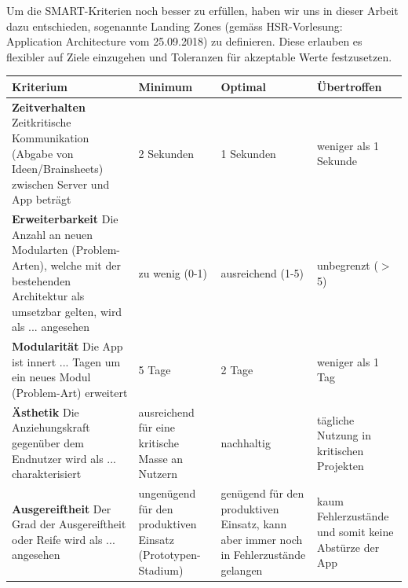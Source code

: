 Um die SMART-Kriterien noch besser zu erfüllen, haben wir uns in dieser Arbeit dazu entschieden, sogenannte Landing Zones (gemäss HSR-Vorlesung: Application Architecture vom 25.09.2018) zu definieren. Diese erlauben es flexibler auf Ziele einzugehen und Toleranzen für akzeptable Werte festzusetzen.

\begin{center}
    \begin{tabular}{ | p{6cm} | p{2.5cm} | p{2.5cm} | p{2.5cm} |}
    	\hline
    Kriterium & Minimum & Optimal & Übertroffen \\ 
    	\hline
    \textbf{Zeitverhalten} \newline Zeitkritische Kommunikation (Abgabe von Ideen/Brainsheets) zwischen Server und App beträgt & 2 Sekunden & 1 Sekunden & weniger als 1 Sekunde \\
    	\hline
    \textbf{Erweiterbarkeit} \newline Die Anzahl an neuen Modularten (Problem-Arten), welche mit der bestehenden Architektur als umsetzbar gelten, wird als ... angesehen & zu wenig (0-1) & ausreichend (1-5) & unbegrenzt ($>$5)\\
    	\hline
    \textbf{Modularität} \newline Die App ist innert ... Tagen um ein neues Modul (Problem-Art) erweitert & 5 Tage & 2 Tage & weniger als 1 Tag \\
    	\hline
    \textbf{Ästhetik} \newline Die Anziehungskraft gegenüber dem Endnutzer wird als ... charakterisiert & ausreichend für eine kritische Masse an Nutzern & nachhaltig & tägliche Nutzung in kritischen Projekten \\
    	\hline
    \textbf{Ausgereiftheit} \newline Der Grad der Ausgereiftheit oder Reife wird als ... angesehen & ungenügend für den produktiven Einsatz (Prototypen-Stadium) & genügend für den produktiven Einsatz, kann aber immer noch in Fehlerzustände gelangen & kaum Fehlerzustände und somit keine Abstürze der App  \\
    	\hline
    \end{tabular}
\end{center}
